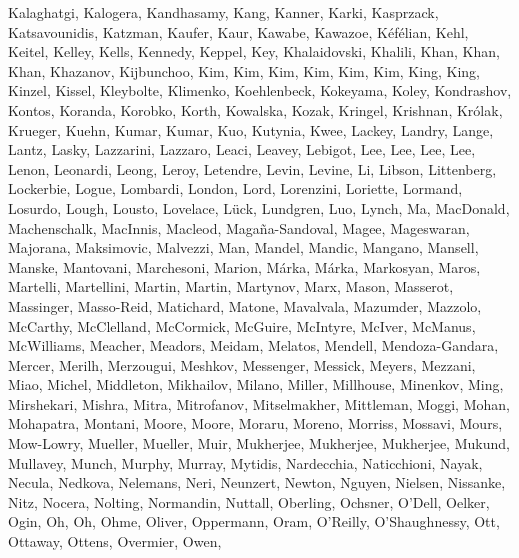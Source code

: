 \documentclass[times,tight]{aastex631}
\begin{document}
\begin{thebibliography}{}
{  {Kalaghatgi}, {Kalogera}, {Kandhasamy}, {Kang}, {Kanner}, {Karki},
  {Kasprzack}, {Katsavounidis}, {Katzman}, {Kaufer}, {Kaur}, {Kawabe},
  {Kawazoe}, {K{\'e}f{\'e}lian}, {Kehl}, {Keitel}, {Kelley}, {Kells},
  {Kennedy}, {Keppel}, {Key}, {Khalaidovski}, {Khalili}, {Khan}, {Khan},
  {Khan}, {Khazanov}, {Kijbunchoo}, {Kim}, {Kim}, {Kim}, {Kim}, {Kim}, {Kim},
  {King}, {King}, {Kinzel}, {Kissel}, {Kleybolte}, {Klimenko}, {Koehlenbeck},
  {Kokeyama}, {Koley}, {Kondrashov}, {Kontos}, {Koranda}, {Korobko}, {Korth},
  {Kowalska}, {Kozak}, {Kringel}, {Krishnan}, {Kr{\'o}lak}, {Krueger}, {Kuehn},
  {Kumar}, {Kumar}, {Kuo}, {Kutynia}, {Kwee}, {Lackey}, {Landry}, {Lange},
  {Lantz}, {Lasky}, {Lazzarini}, {Lazzaro}, {Leaci}, {Leavey}, {Lebigot},
  {Lee}, {Lee}, {Lee}, {Lee}, {Lenon}, {Leonardi}, {Leong}, {Leroy},
  {Letendre}, {Levin}, {Levine}, {Li}, {Libson}, {Littenberg}, {Lockerbie},
  {Logue}, {Lombardi}, {London}, {Lord}, {Lorenzini}, {Loriette}, {Lormand},
  {Losurdo}, {Lough}, {Lousto}, {Lovelace}, {L{\"u}ck}, {Lundgren}, {Luo},
  {Lynch}, {Ma}, {MacDonald}, {Machenschalk}, {MacInnis}, {Macleod},
  {Maga{\~n}a-Sandoval}, {Magee}, {Mageswaran}, {Majorana}, {Maksimovic},
  {Malvezzi}, {Man}, {Mandel}, {Mandic}, {Mangano}, {Mansell}, {Manske},
  {Mantovani}, {Marchesoni}, {Marion}, {M{\'a}rka}, {M{\'a}rka}, {Markosyan},
  {Maros}, {Martelli}, {Martellini}, {Martin}, {Martin}, {Martynov}, {Marx},
  {Mason}, {Masserot}, {Massinger}, {Masso-Reid}, {Matichard}, {Matone},
  {Mavalvala}, {Mazumder}, {Mazzolo}, {McCarthy}, {McClelland}, {McCormick},
  {McGuire}, {McIntyre}, {McIver}, {McManus}, {McWilliams}, {Meacher},
  {Meadors}, {Meidam}, {Melatos}, {Mendell}, {Mendoza-Gandara}, {Mercer},
  {Merilh}, {Merzougui}, {Meshkov}, {Messenger}, {Messick}, {Meyers},
  {Mezzani}, {Miao}, {Michel}, {Middleton}, {Mikhailov}, {Milano}, {Miller},
  {Millhouse}, {Minenkov}, {Ming}, {Mirshekari}, {Mishra}, {Mitra},
  {Mitrofanov}, {Mitselmakher}, {Mittleman}, {Moggi}, {Mohan}, {Mohapatra},
  {Montani}, {Moore}, {Moore}, {Moraru}, {Moreno}, {Morriss}, {Mossavi},
  {Mours}, {Mow-Lowry}, {Mueller}, {Mueller}, {Muir}, {Mukherjee}, {Mukherjee},
  {Mukherjee}, {Mukund}, {Mullavey}, {Munch}, {Murphy}, {Murray}, {Mytidis},
  {Nardecchia}, {Naticchioni}, {Nayak}, {Necula}, {Nedkova}, {Nelemans},
  {Neri}, {Neunzert}, {Newton}, {Nguyen}, {Nielsen}, {Nissanke}, {Nitz},
  {Nocera}, {Nolting}, {Normandin}, {Nuttall}, {Oberling}, {Ochsner}, {O'Dell},
  {Oelker}, {Ogin}, {Oh}, {Oh}, {Ohme}, {Oliver}, {Oppermann}, {Oram},
  {O'Reilly}, {O'Shaughnessy}, {Ott}, {Ottaway}, {Ottens}, {Overmier}, {Owen},
}
\end{thebibliography}
\end{document}
